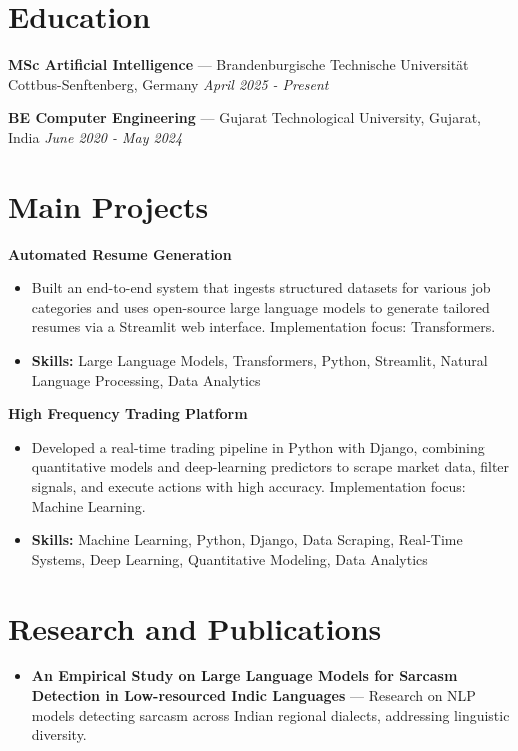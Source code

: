 \documentclass[a4paper,10pt]{article}
\begin{document}
\section*{Education}
\textbf{MSc Artificial Intelligence} — Brandenburgische Technische Universität Cottbus-Senftenberg, Germany \hfill \textit{April 2025 - Present}\par
\vspace{1.5pt}
\textbf{BE Computer Engineering} — Gujarat Technological University, Gujarat, India \hfill \textit{June 2020 - May 2024}\par

\section*{Main Projects}
\textbf{Automated Resume Generation}\par
\vspace{1pt}
\begin{itemize}
  \item Built an end-to-end system that ingests structured datasets for various job categories and uses open-source large language models to generate tailored resumes via a Streamlit web interface. Implementation focus: Transformers.
  \item \textbf{Skills:} Large Language Models, Transformers, Python, Streamlit, Natural Language Processing, Data Analytics
\end{itemize}
\vspace{3pt}
\textbf{High Frequency Trading Platform}\par
\vspace{1pt}
\begin{itemize}
  \item Developed a real-time trading pipeline in Python with Django, combining quantitative models and deep-learning predictors to scrape market data, filter signals, and execute actions with high accuracy. Implementation focus: Machine Learning.
  \item \textbf{Skills:} Machine Learning, Python, Django, Data Scraping, Real-Time Systems, Deep Learning, Quantitative Modeling, Data Analytics
\end{itemize}

\section*{Research and Publications}
\begin{itemize}
\item \textbf{An Empirical Study on Large Language Models for Sarcasm Detection in Low-resourced Indic Languages} — Research on NLP models detecting sarcasm across Indian regional dialects, addressing linguistic diversity.
\end{itemize}
\end{document}
